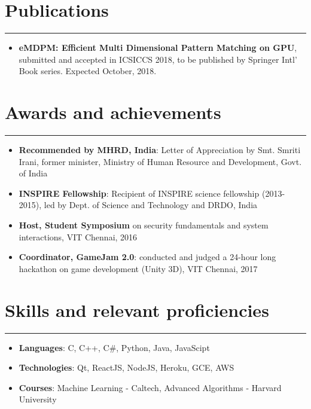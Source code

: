 \documentclass[9pt, a4paper]{article}
\begin{document}
\section*{Publications}
\vspace{-8px}
\hrule
\vspace{8px}
\begin{itemize}
	\item \textbf{eMDPM: Efficient Multi Dimensional Pattern Matching on GPU}, submitted and accepted in ICSICCS 2018, to be published by Springer Intl' Book series. Expected October, 2018.
\end{itemize}

\section*{Awards and achievements}
\vspace{-8px}
\hrule
\vspace{8px}
\begin{itemize}
	\item \textbf{Recommended by MHRD, India}: Letter of Appreciation by Smt. Smriti Irani, former minister, Ministry of Human Resource and Development, Govt. of India
	\item \textbf{INSPIRE Fellowship}: Recipient of INSPIRE science fellowship (2013-2015), led by Dept. of Science and Technology and DRDO, India
	\item \textbf{Host, Student Symposium} on security fundamentals and system interactions, VIT Chennai, 2016
	\item \textbf{Coordinator, GameJam 2.0}: conducted and judged a 24-hour long hackathon on game development (Unity 3D), VIT Chennai, 2017
\end{itemize}

\section*{Skills and relevant proficiencies}
\vspace{-8px}
\hrule
\vspace{8px}
\begin{itemize}
	\item \textbf{Languages}: C, C++, C\#, Python, Java, JavaScipt
	\item \textbf{Technologies}: Qt, ReactJS, NodeJS, Heroku, GCE, AWS
	\item \textbf{Courses}: Machine Learning - Caltech, Advanced Algorithms - Harvard University
\end{itemize}
\end{document}
